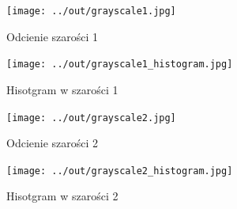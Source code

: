 \documentclass[a4paper,12pt]{article}
\begin{document}
\begin{figure}[ht!]
\begin{minipage}[t]{7.5cm}
\begin{center}
\texttt{[image: ../out/grayscale1.jpg]}
\caption{Odcienie szarości 1}
\end{center}
\end{minipage}
\hfill
\begin{minipage}[t]{7.5cm}
\begin{center}
\texttt{[image: ../out/grayscale1\_histogram.jpg]}
\caption{Hisotgram w szarości 1}
\end{center}
\end{minipage}
\end{figure} 

\begin{figure}[ht!]
\begin{minipage}[t]{7.5cm}
\begin{center}
\texttt{[image: ../out/grayscale2.jpg]}
\caption{Odcienie szarości 2}
\end{center}
\end{minipage}
\hfill
\begin{minipage}[t]{7.5cm}
\begin{center}
\texttt{[image: ../out/grayscale2\_histogram.jpg]}
\caption{Hisotgram w szarości 2}
\end{center}
\end{minipage}
\end{figure} 


\end{document}
